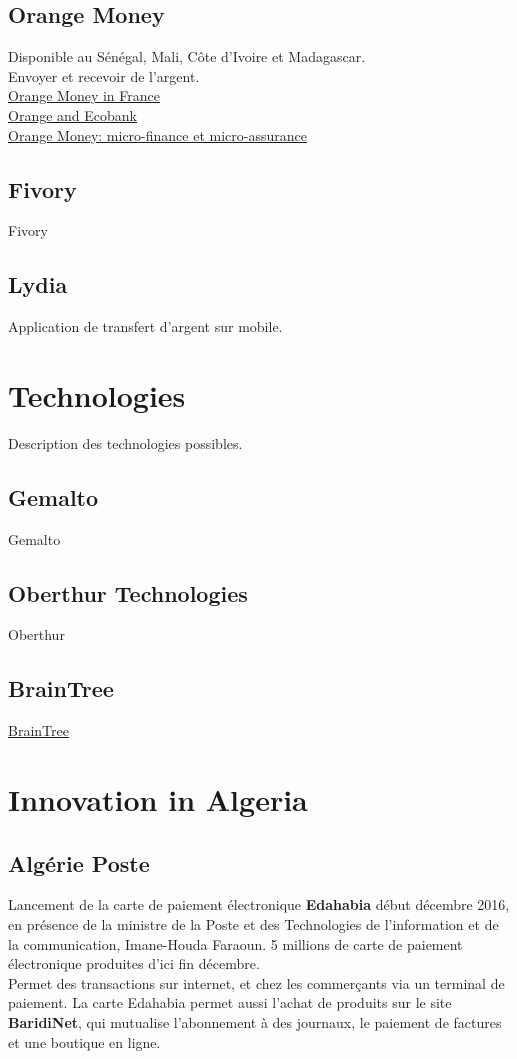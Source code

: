 \documentclass{report}
\begin{document}
\section{Orange Money}
Disponible au Sénégal, Mali, Côte d'Ivoire et Madagascar. \\
Envoyer et recevoir de l'argent. \\
\href{http://www.orange.com/en/Press-and-medias/press-releases-2016/Orange-launches-Orange-Money-in-France-to-allow-money-transfers-to-three-countries-in-Africa-and-within-mainland-France}{Orange Money in France} \\
\href{http://www.orange.com/en/Press-and-medias/press-releases-2016/Orange-and-Ecobank-launch-a-bank-to-wallet-money-transfer-service-linked-to-Orange-Money-in-Cote-d-Ivoire-Guinea-Conakry-and-Niger}{Orange and Ecobank} \\
\href{http://www.jeuneafrique.com/355624/economie/orange-money-vise-de-nouveaux-partenariats-microfinance-microassurance/}{Orange Money: micro-finance et micro-assurance}
\section{Fivory}
Fivory
\section{Lydia}
Application de transfert d'argent sur mobile.

\chapter{Technologies}
Description des technologies possibles.
\section{Gemalto}
Gemalto
\section{Oberthur Technologies}
Oberthur
\section{BrainTree}
\href{https://www.braintreepayments.com/}{BrainTree}

\chapter{Innovation in Algeria}
\section{Algérie Poste}
Lancement de la carte de paiement électronique \textbf{Edahabia} début décembre 2016,
en présence de la ministre de la Poste et des Technologies de l'information et de la communication, Imane-Houda Faraoun.
5 millions de carte de paiement électronique produites d'ici fin décembre. \\
Permet des transactions sur internet, et chez les commerçants via un terminal de paiement.
La carte Edahabia permet aussi l'achat de produits sur le site \textbf{BaridiNet}, qui mutualise l'abonnement à des journaux, le paiement de factures et une boutique en ligne.
\end{document}
